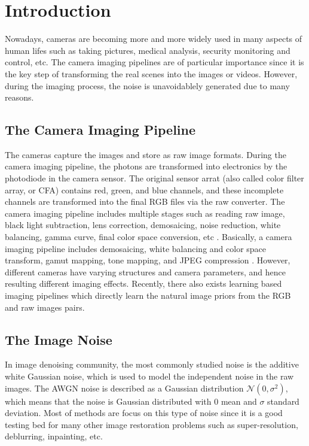 %
\chapter{Introduction}
\label{sec:intro}



Nowadays, cameras are becoming more and more widely used in many aspects of human lifes such as taking pictures, medical analysis, security monitoring and control, etc. The camera imaging pipelines are of particular importance since it is the key step of transforming the real scenes into the images or videos. However, during the imaging process, the noise is unavoidablely generated due to many reasons.

\section{The Camera Imaging Pipeline}
\label{sec:intro:general}

The cameras capture the images and store as raw image formats. During the camera imaging pipeline, the photons are transformed into electronics by the photodiode in the camera sensor. The original sensor arrat (also called color filter array, or CFA) contains red, green, and blue channels, and these incomplete channels are transformed into the final RGB files via the raw converter. The camera imaging pipeline includes multiple stages such as reading raw image, black light subtraction, lens correction, demosaicing, noise reduction, white balancing, gamma curve, final color space conversion, etc \cite{browneccv2016}. Basically, a camera imaging pipeline includes demosaicing, white balancing and color space transform, gamut mapping, tone mapping, and JPEG compression \cite{crosschannel}. However, different cameras have varying structures and camera parameters, and hence resulting different imaging effects. Recently, there also exists learning based imaging pipelines which directly learn the  natural image priors from the RGB and raw images pairs.


\section{The Image Noise}
\label{sec:intro:current}

In image denoising community, the most commonly studied noise is the additive white Gaussian noise, which is used to model the independent noise in the raw images. The AWGN noise is described as a Gaussian distribution $\mathcal{N}(0,\sigma^{2})$, which means that the noise is Gaussian distributed with $0$ mean and $\sigma$ standard deviation. Most of methods are focus on this type of noise since it is a good testing bed for many other image restoration problems such as super-resolution, deblurring, inpainting, etc.

